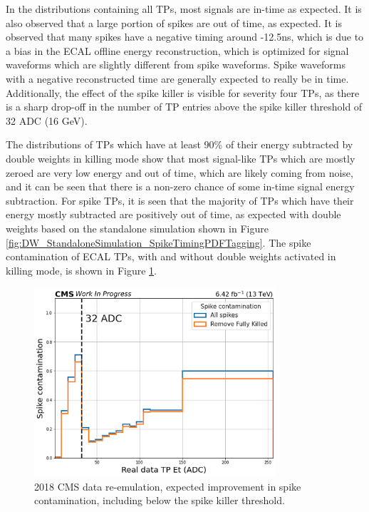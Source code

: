 In the distributions containing all TPs, most signals are in-time as expected. It is also observed that a large portion of spikes are out of time, as expected. It is observed that many spikes have a negative timing around -12.5ns, which is due to a bias in the ECAL offline energy reconstruction, which is optimized for signal waveforms which are slightly different from spike waveforms. Spike waveforms with a negative reconstructed time are generally expected to really be in time. Additionally, the effect of the spike killer is visible for severity four TPs, as there is a sharp drop-off in the number of TP entries above the spike killer threshold of 32 ADC (16 GeV). 

The distributions of TPs which have at least 90\% of their energy subtracted by double weights in killing mode show that most signal-like TPs which are mostly zeroed are very low energy and out of time, which are likely coming from noise, and it can be seen that there is a non-zero chance of some in-time signal energy subtraction. For spike TPs, it is seen that the majority of TPs which have their energy mostly subtracted are positively out of time, as expected with double weights based on the standalone simulation shown in Figure \ref{fig:DW_StandaloneSimulation_SpikeTimingPDFTagging}. The spike contamination of ECAL TPs, with and without double weights activated in killing mode, is shown in Figure \ref{fig:DW_2018Reemulation_SpikeContamination}. 

\begin{figure}[H]
    \centering
    \includegraphics[width=0.8\textwidth]{Images/ECAL/DW/SpikeContamination_DoubleWeights.png}
    \caption{2018 CMS data re-emulation, expected improvement in spike contamination, including below the spike killer threshold.}
    \label{fig:DW_2018Reemulation_SpikeContamination}
\end{figure}

